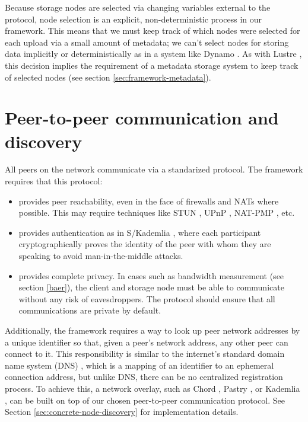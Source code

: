 \documentclass[8pt,fleqn,openany]{book}
\begin{document}
Because storage
nodes are selected via changing variables external to the protocol, node
selection is an explicit, non-deterministic process in our framework. This means
that we must keep track of which nodes were selected for each upload via a
small amount of metadata; we can't select nodes for storing data implicitly or
deterministically as in a system like Dynamo \cite{dynamo}. As with Lustre
\cite{lustre}, this decision
implies the requirement of a metadata storage system to keep track
of selected nodes (see section \ref{sec:framework-metadata}).

\section{Peer-to-peer communication and discovery}

All peers on the network communicate via a standarized protocol. The
framework requires that this protocol:

\begin{itemize}
\item provides peer reachability, even in the face of firewalls
and NATs where possible.
This may require techniques like STUN \cite{stun}, UPnP \cite{upnp},
NAT-PMP \cite{natpmp}, etc.
\item provides authentication as in S/Kademlia \cite{skad},
where each participant cryptographically
proves the identity of the peer with whom they are speaking to avoid
man-in-the-middle attacks.
\item provides complete privacy. In cases such as bandwidth measurement
(see section \ref{baer}), the client and storage node must be able
to communicate without any risk of eavesdroppers. The protocol should
ensure that all communications are private by default.
\end{itemize}

Additionally, the framework requires a way to look up peer network addresses
by a unique identifier so that, given a peer's network address, any other
peer can connect to it. This responsibility is similar to the internet's
standard domain name system (DNS) \cite{dns},
which is a mapping of an identifier to an
ephemeral connection address, but unlike DNS, there can be no centralized
registration process.
To achieve this, a network overlay, such as Chord \cite{chord},
Pastry \cite{pastry}, or Kademlia \cite{kad}, can be
built on top of our chosen peer-to-peer communication protocol.
See Section \ref{sec:concrete-node-discovery} for
implementation details.
\end{document}
